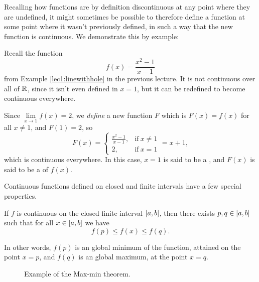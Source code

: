 
Recalling how functions are by definition discontinuous at any point where they are undefined, it might sometimes be possible to therefore define a function at some point where it wasn't previously defined, in such a way that the new function is continuous.
We demonstrate this by example:

\begin{example}
	Recall the function
	\[
		f(x) = \frac{x^2 - 1}{x - 1}
	\]
	from Example \ref{lec1:linewithhole} in the previous lecture.
	It is not continuous over all of $\mathbb{R}$, since it isn't even defined in $x = 1$, but it can be redefined to become continuous everywhere.

	Since $\lim\limits_{x \to 1} f(x) = 2$, we \emph{define} a new function $F$ which is $F(x) = f(x)$ for all $x \neq 1$, and $F(1) = 2$, so
	\[
		F(x) = \begin{cases}
		\frac{x^2 - 1}{x - 1}, & \text{if}~ x \neq 1 \\
		2, & \text{if}~ x = 1
		\end{cases}
		= x + 1,
	\]
	which is continuous everywhere.
	In this case, $x = 1$ is said to be a , and $F(x)$ is said to be a  of $f(x)$.
\end{example}


Continuous functions defined on closed and finite intervals have a few special properties.

\begin{theorem}
	If $f$ is continuous on the closed finite interval $\interval{a}{b}$, then there exists $p, q \in \interval{a}{b}$ such that for all $x \in \interval{a}{b}$ we have
	\[
		f(p) \leq f(x) \leq f(q).
	\]

	\noindent
	In other words, $f(p)$ is an global minimum of the function, attained on the point $x = p$, and $f(q)$ is an global maximum, at the point $x = q$.
\end{theorem}

\begin{figure}
	\centering
	\caption{Example of the Max-min theorem.}
\end{figure}

